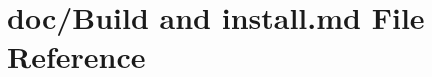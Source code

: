 \hypertarget{_build_01and_01install_8md}{\section{doc/\-Build and install.\-md File Reference}
\label{_build_01and_01install_8md}
}
